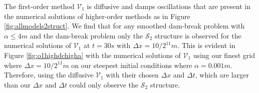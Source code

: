 \documentclass[times]{elsarticle}
\begin{document}
The first-order method $\mathcal{V}_1$ is diffusive \cite{Zoppou-etal-2017} and damps oscillations that are present in the numerical solutions of higher-order methods as in Figure \ref{fig:allmodels2struct}. We find that for any smoothed dam-break problem with $\alpha \le 4m$ and the dam-break problem only the $\mathcal{S}_2$ structure is observed for the numerical solutions of $\mathcal{V}_1$ at $t=30s$ with $\Delta x = 10/2 ^{11}m$. This is evident in Figure \ref{fig:o1highdchigha} with the numerical solutions of $\mathcal{V}_1$ using our finest grid where $\Delta x = 10/2^{11}m$ on our steepest initial conditions where $\alpha = 0.001m$. Therefore, \citet{Hank-etal-2010-2034} using the diffusive $\mathcal{V}_1$ with their chosen $\Delta x$ and $\Delta t$, which are larger than our $\Delta x$ and $\Delta t$ could only observe the $\mathcal{S}_2$ structure. 
\end{document}
